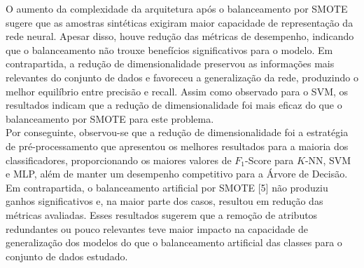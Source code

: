 O aumento da complexidade da arquitetura após o balanceamento por SMOTE sugere que as amostras sintéticas exigiram maior capacidade de representação da rede neural. Apesar disso, houve redução das métricas de desempenho, indicando que o balanceamento não trouxe benefícios significativos para o modelo. Em contrapartida, a redução de dimensionalidade preservou as informações mais relevantes do conjunto de dados e favoreceu a generalização da rede, produzindo o melhor equilíbrio entre precisão e recall. Assim como observado para o SVM, os resultados indicam que a redução de dimensionalidade foi mais eficaz do que o balanceamento por SMOTE para este problema.
\\
Por conseguinte, observou-se que a redução de dimensionalidade foi a estratégia de pré-processamento que apresentou os melhores resultados para a maioria dos classificadores, proporcionando os maiores valores de $F_1$-Score para $K$-NN, SVM e MLP, além de manter um desempenho competitivo para a Árvore de Decisão. Em contrapartida, o balanceamento artificial por SMOTE [5] não produziu ganhos significativos e, na maior parte dos casos, resultou em redução das métricas avaliadas. Esses resultados sugerem que a remoção de atributos redundantes ou pouco relevantes teve maior impacto na capacidade de generalização dos modelos do que o balanceamento artificial das classes para o conjunto de dados estudado.
